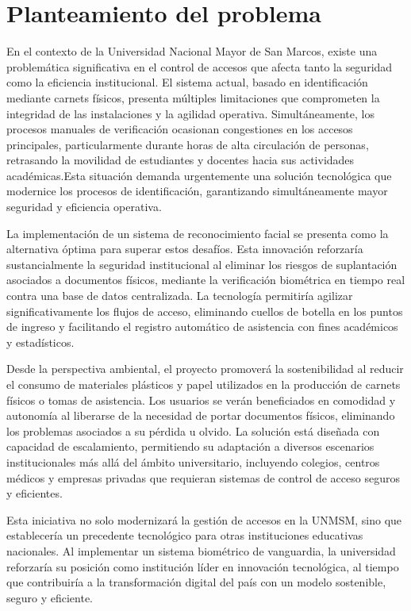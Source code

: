 \documentclass[12pt]{article}
\begin{document}
{\section{Planteamiento del problema}
En el contexto de la Universidad Nacional Mayor de San Marcos, existe una problemática significativa en el control de accesos que afecta tanto la seguridad como la eficiencia institucional. El sistema actual, basado en identificación mediante carnets físicos, presenta múltiples limitaciones que comprometen la integridad de las instalaciones y la agilidad operativa. Simultáneamente, los procesos manuales de verificación ocasionan congestiones en los accesos principales, particularmente durante horas de alta circulación de personas, retrasando la movilidad de estudiantes y docentes hacia sus actividades académicas.Esta situación demanda urgentemente una solución tecnológica que modernice los procesos de identificación, garantizando simultáneamente mayor seguridad y eficiencia operativa.

La implementación de un sistema de reconocimiento facial se presenta como la alternativa óptima para superar estos desafíos. Esta innovación reforzaría sustancialmente la seguridad institucional al eliminar los riesgos de suplantación asociados a documentos físicos, mediante la verificación biométrica en tiempo real contra una base de datos centralizada. La tecnología permitiría agilizar significativamente los flujos de acceso, eliminando cuellos de botella en los puntos de ingreso y facilitando el registro automático de asistencia con fines académicos y estadísticos.

Desde la perspectiva ambiental, el proyecto promoverá la sostenibilidad al reducir el consumo de materiales plásticos y papel utilizados en la producción de carnets físicos o tomas de asistencia. Los usuarios se verán beneficiados en comodidad y autonomía al liberarse de la necesidad de portar documentos físicos, eliminando los problemas asociados a su pérdida u olvido. La solución está diseñada con capacidad de escalamiento, permitiendo su adaptación a diversos escenarios institucionales más allá del ámbito universitario, incluyendo colegios, centros médicos y empresas privadas que requieran sistemas de control de acceso seguros y eficientes.

Esta iniciativa no solo modernizará la gestión de accesos en la UNMSM, sino que establecería un precedente tecnológico para otras instituciones educativas nacionales. Al implementar un sistema biométrico de vanguardia, la universidad reforzaría su posición como institución líder en innovación tecnológica, al tiempo que contribuiría a la transformación digital del país con un modelo sostenible, seguro y eficiente.


}
\end{document}
